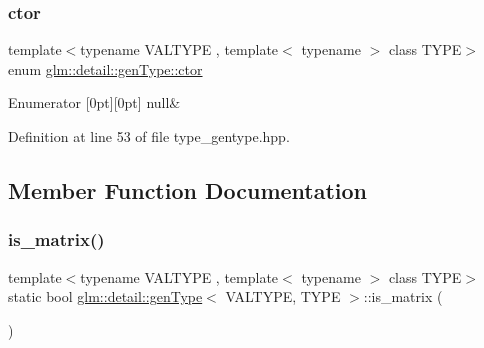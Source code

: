 \subsubsection{\texorpdfstring{ctor}{ctor}}
{\footnotesize\ttfamily template$<$typename V\+A\+L\+T\+Y\+PE , template$<$ typename $>$ class T\+Y\+PE$>$ \\
enum \hyperlink{structglm_1_1detail_1_1gen_type_a67fe8a1e8d43ab9e9151868ed277be94}{glm\+::detail\+::gen\+Type\+::ctor}}

\begin{DoxyEnumFields}{Enumerator}
[0pt][0pt]{}\mbox{\label{structglm_1_1detail_1_1gen_type_a67fe8a1e8d43ab9e9151868ed277be94a95dbe65e3036a53702aa8c21f040d753}} 
null&\\
\hline

\end{DoxyEnumFields}


Definition at line 53 of file type\+\_\+gentype.\+hpp.



\subsection{Member Function Documentation}
\mbox{\label{structglm_1_1detail_1_1gen_type_a78c650375558d5e2ccfba383cdb59479}} 
\subsubsection{\texorpdfstring{is\+\_\+matrix()}{is\_matrix()}}
{\footnotesize\ttfamily template$<$typename V\+A\+L\+T\+Y\+PE , template$<$ typename $>$ class T\+Y\+PE$>$ \\
static bool \hyperlink{structglm_1_1detail_1_1gen_type}{glm\+::detail\+::gen\+Type}$<$ V\+A\+L\+T\+Y\+PE, T\+Y\+PE $>$\+::is\+\_\+matrix (\begin{DoxyParamCaption}{ }\end{DoxyParamCaption})\hspace{0.3cm}{\ttfamily [static]}}

